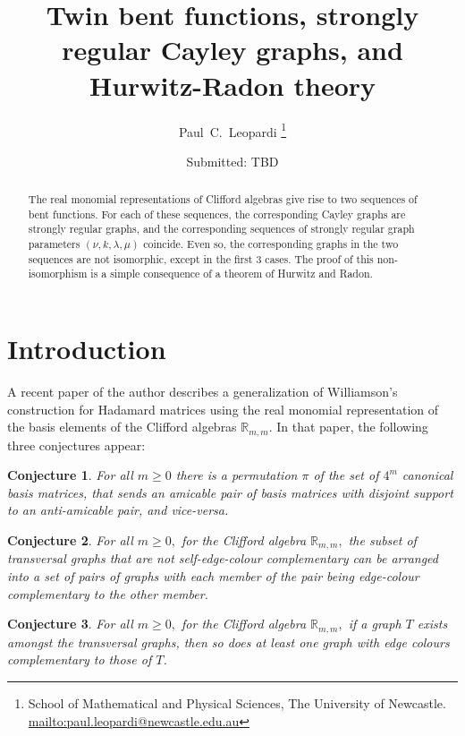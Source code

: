 \documentclass[12pt,a4paper]{article}
\title{Twin bent functions, strongly regular Cayley graphs, and Hurwitz-Radon theory}
\author{
Paul~C.~Leopardi
\thanks{School of Mathematical and Physical Sciences, The University of Newcastle.
\protect\url{mailto:paul.leopardi@newcastle.edu.au}}
}
\date{Submitted: TBD}
\newcommand{\mb}[1]{\mathbb{#1}}
\newcommand{\R}{\mb{R}}
\newtheorem{Conjecture}{Conjecture}
\begin{document}
\maketitle

\begin{abstract}
%
The real monomial representations of Clifford algebras
give rise to two sequences of bent functions.
For each of these sequences, the corresponding Cayley graphs are 
strongly regular graphs, and the corresponding sequences of strongly regular graph parameters
$(\nu,k,\lambda,\mu)$ coincide.
Even so, the corresponding graphs in the two sequences are not isomorphic, except in the first 3 cases.
The proof of this non-isomorphism is a simple consequence of a theorem of Hurwitz and Radon.  
%
\end{abstract}

\section{Introduction}
\label{sec-Introduction}

A recent paper of the author \cite{Leo14Constructions} describes a generalization of
Williamson's construction for Hada\-mard matrices \cite{Wil44}
using the real monomial representation of the basis elements of the Clifford algebras $\R_{m,m}$.
In that paper, the following three conjectures appear:

\begin{Conjecture}\label{conjecture-1}
%
For all $m \geqslant 0$ there is a permutation $\pi$ of the set of $4^m$ canonical basis matrices,
that sends an amicable pair of basis matrices with disjoint support to an anti-amicable pair, and vice-versa.
%
\end{Conjecture}

\begin{Conjecture}\label{conjecture-2}
%
For all $m \geqslant 0,$ 
for the Clifford algebra $\R_{m,m},$ the subset of transversal graphs that are 
not self-edge-colour complementary
can be arranged into a set of pairs of graphs with each member of the pair 
being edge-colour complementary to the other member.
%
\end{Conjecture}

\begin{Conjecture}\label{conjecture-3}
%
For all $m \geqslant 0,$ 
for the Clifford algebra $\R_{m,m},$ if a graph $T$ exists amongst the transversal graphs,
then so does at least one graph with edge colours complementary to those of $T$.
%
\end{Conjecture}
\end{document}
